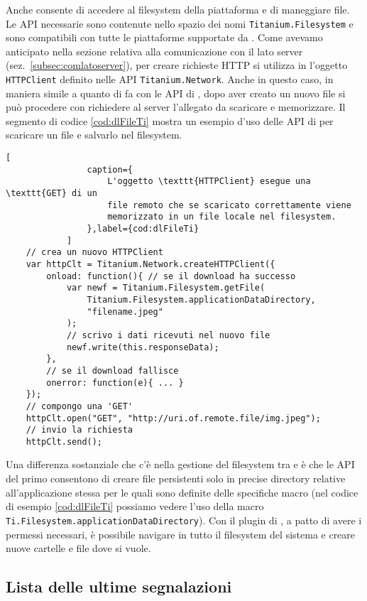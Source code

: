 			Anche \tisdk{} consente di accedere al filesystem della piattaforma 
			e di maneggiare file. Le API necessarie sono contenute nello 
			spazio dei nomi \texttt{Titanium.Filesystem} e sono compatibili 
			con tutte le piattaforme supportate da \tisdk{}. Come avevamo 
			anticipato nella sezione relativa alla comunicazione con il lato 
			server (sez.~\ref{subsec:comlatoserver}), per creare richieste HTTP 
			si utilizza in \tisdk{} l'oggetto \texttt{HTTPClient} definito nelle 
			API \texttt{Titanium.Network}. Anche in questo caso, in maniera 
			simile a quanto di fa con le API di \pg{}, dopo aver creato un nuovo 
			file si può procedere con richiedere al server l'allegato da 
			scaricare e memorizzare. Il segmento di codice \ref{cod:dlFileTi} 
			mostra un esempio d'uso delle API di \tisdk{} per scaricare un file 
			e salvarlo nel filesystem.
			\begin{lstlisting}[
				caption={
					L'oggetto \texttt{HTTPClient} esegue una \texttt{GET} di un 
					file remoto che se scaricato correttamente viene 
					memorizzato in un file locale nel filesystem.
				},label={cod:dlFileTi}
			]
	// crea un nuovo HTTPClient
	var httpClt = Titanium.Network.createHTTPClient({
		onload: function(){ // se il download ha successo
			var newf = Titanium.Filesystem.getFile(
				Titanium.Filesystem.applicationDataDirectory,
				"filename.jpeg"
			);
			// scrivo i dati ricevuti nel nuovo file
			newf.write(this.responseData);
		},
		// se il download fallisce
		onerror: function(e){ ... }
	});
	// compongo una 'GET'
	httpClt.open("GET", "http://uri.of.remote.file/img.jpeg");
	// invio la richiesta
	httpClt.send();
			\end{lstlisting}
			Una differenza sostanziale che c'è nella gestione del filesystem 
			tra \tisdk{} e \pg{} è che le API del primo consentono di creare 
			file persistenti solo in precise directory relative 
			all'applicazione stessa per le quali sono definite delle specifiche 
			macro (nel codice di esempio \ref{cod:dlFileTi} possiamo vedere
			l'uso della macro \texttt{Ti.Filesystem.applicationDataDirectory}). 
			Con il plugin di \pg{}, a patto di avere i permessi necessari, è 
			possibile navigare in tutto il filesystem del sistema e creare nuove 
			cartelle e file dove si vuole.
		

        \subsection{Lista delle ultime segnalazioni}
        
